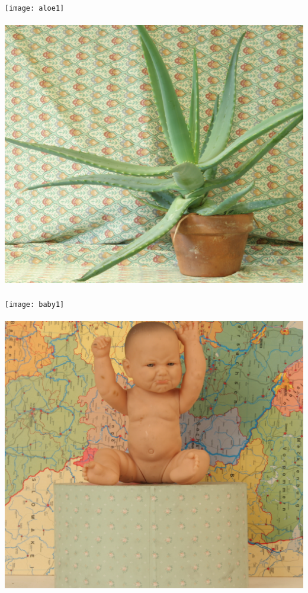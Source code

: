 \documentclass[conference, harvard, brazil, english]{sbatex}
\begin{document}
			\begin{center}
				\texttt{[image: aloe1]}
				\paragraph{}
				\includegraphics[scale=0.1]{aloeL}
				\paragraph{}
				\texttt{[image: baby1]}
				\paragraph{}
				\includegraphics[scale=0.1]{babyL}
			\end{center}
\end{document}
